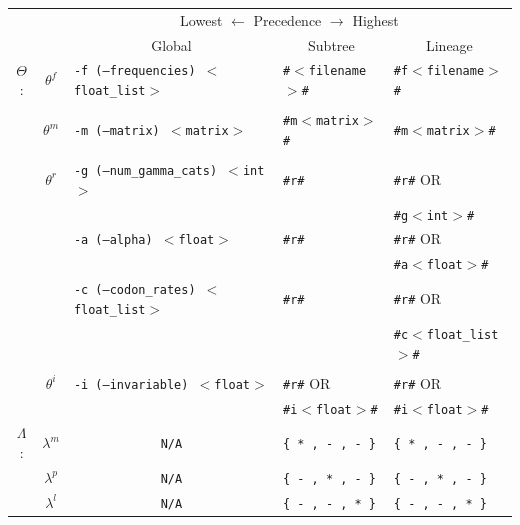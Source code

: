 \documentclass[10pt]{article}
\newcommand{\version}{2.0.8 }
\newcommand{\iSGcurrentshort}{iSGv\version }
\begin{document}
\begin{center}
\begin{threeparttable}
\caption{\it Environment options and the options that override them for the different input files to \iSGcurrentshort.}
\begin{tabular}{cclll}
 \hline \hline
 && \multicolumn{3}{c}{Lowest $\longleftarrow$ Precedence $\longrightarrow$ Highest} \\\cline{3-5}
 && \multicolumn{1}{c}{Global\tnote{1}} & \multicolumn{1}{c}{Subtree\tnote{2}} & \multicolumn{1}{c}{Lineage\tnote{3}} \\
\hline

 $\Theta$:
 & $\theta^f$
   & \texttt{-f (--frequencies) $<$float\_list$>$}
   & \texttt{\#$<$filename$>$\# }
   & \texttt{\#f$<$filename$>$\#}
 \\\\
 & $\theta^m$
   & \texttt{-m (--matrix) $<$matrix$>$}
   & \texttt{\#m$<$matrix$>$\#}
   & \texttt{\#m$<$matrix$>$\#}
 \\\\
 & $\theta^r$
   & \texttt{-g (--num\_gamma\_cats) $<$int$>$}
   & \texttt{\#r\#}
   & \texttt{\#r\#} {\small OR}
 \\
 &
   &
   &
   & \texttt{\#g$<$int$>$\#}
 \\
 &
   & \texttt{-a (--alpha) $<$float$>$}
   & \texttt{\#r\#}
   & \texttt{\#r\#} {\small OR}
 \\
 &
   &
   &
   & \texttt{\#a$<$float$>$\#}
 \\
 &
   & \texttt{-c (--codon\_rates) $<$float\_list$>$}
   & \texttt{\#r\#}
   & \texttt{\#r\#} {\small OR}
 \\
 &
   &
   &
   & \texttt{\#c$<$float\_list$>$\#}
 \\\\
 & $\theta^i$
   & \texttt{-i (--invariable) $<$float$>$}
   & \texttt{\#r\#} {\small OR}
   & \texttt{\#r\#} {\small OR}
 \\
 &
   &
   & \texttt{\#i$<$float$>$\#}
   & \texttt{\#i$<$float$>$\#}
 \\
 \hline
 $\Lambda$\tnote{4}:
 & $\lambda^m$
   & \multicolumn{1}{c}{\texttt{N/A}}
   & \texttt{\{ * , - , - \}}
   & \texttt{\{ * , - , - \}}
 \\
 & $\lambda^p$
   & \multicolumn{1}{c}{\texttt{N/A}}
   & \texttt{\{ - , * , - \}}
   & \texttt{\{ - , * , - \}}
 \\
 & $\lambda^l$
   & \multicolumn{1}{c}{\texttt{N/A}}
   & \texttt{\{ - , - , * \}}
   & \texttt{\{ - , - , * \}}
 \\

\end{tabular}
\end{threeparttable}
\end{center}
\end{document}
